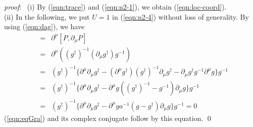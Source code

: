 \documentclass[makeidx,12pt,openany]{report}
\begin{document}
\textit{proof}: \ 
(i) By (\ref{eqn:trace}) and (\ref{eqn:n2-1}), 
we obtain (\ref{eqn:loc-coord}). \\
(ii) In the following, we put $U=1$ in (\ref{eqn:n2-4}) 
without loss of generality. 
By using (\ref{eqn:dag}), we have 
\begin{eqnarray*}
[P, \square P] &=& \partial^{\mu}[P, \partial_{\mu}P] \\
&=& \partial^{\mu}((g^{\dag})^{-1}(\partial_{\mu}g^{\dag})g^{-1}) \\
&=& (g^{\dag})^{-1} \{ \partial^{\mu}\partial_{\mu}g^{\dag}
-(\partial^{\mu}g^{\dag})(g^{\dag})^{-1}\partial_{\mu}g^{\dag}
-\partial_{\mu}g^{\dag}g^{-1}\partial^{\mu}g \} g^{-1} \\
&=& (g^{\dag})^{-1} \{ \partial^{\mu}\partial_{\mu}g^{\dag}
-\partial^{\mu}g ((g^{\dag})^{-1}-g^{-1}) \partial_{\mu}g \} g^{-1} \\
&=& (g^{\dag})^{-1} \{ \partial^{\mu}\partial_{\mu}g^{\dag}
-\partial^{\mu}g a^{-1}(g-g^{\dag}) \partial_{\mu}g \} g^{-1} =0
\end{eqnarray*}
(\ref{eqn:eqGra}) and its complex conjugate follow by this equation. \qed 
\end{document}
